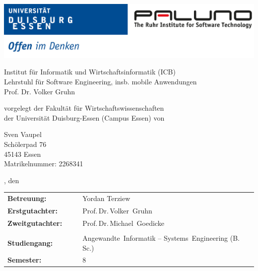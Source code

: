 \pagestyle{empty} %

\includegraphics[width=\textwidth]{./img/logo_unidue_paluno_deutsch.pdf}

\begin{sffamily}

\begin{center}

\vspace*{0.7cm}

\normalsize{Institut für Informatik und Wirtschaftsinformatik (ICB)\\%
Lehrstuhl für Software Engineering, insb. mobile Anwendungen\\
Prof. Dr. Volker Gruhn}


\vspace*{2.5cm}

\LARGE{\documentHeading}

\vspace*{1cm}

\large{\documentType}

\vspace*{2.5cm}

\normalsize{vorgelegt der Fakultät für Wirtschaftswissenschaften\\
der Universität Duisburg-Essen (Campus Essen) von}

\vspace*{\baselineskip}

\normalsize{
Sven Vaupel \\
Schölerpad 76 \\
45143 Essen \\
Matrikelnummer: 2268341
}

\vspace*{1.5cm}

\small{\documentLocation, den \documentDate}

\vspace*{1.5cm}

\normalsize{
\begin{tabular*}{\linewidth}{p{0.3\linewidth}p{0.7\linewidth}}
\textbf{Betreuung:}      & Yordan Terziew\\
\textbf{Erstgutachter:}  & Prof.\,Dr.\,Volker~Gruhn\\
\textbf{Zweitgutachter:} & Prof.\,Dr.\,Michael~Goedicke\\
\\
\textbf{Studiengang:}    & Angewandte~Informatik -- Systems~Engineering (B.\,Sc.)\\
\textbf{Semester:}       & 8
\end{tabular*}
}

\end{center}

\end{sffamily}
\clearpage
